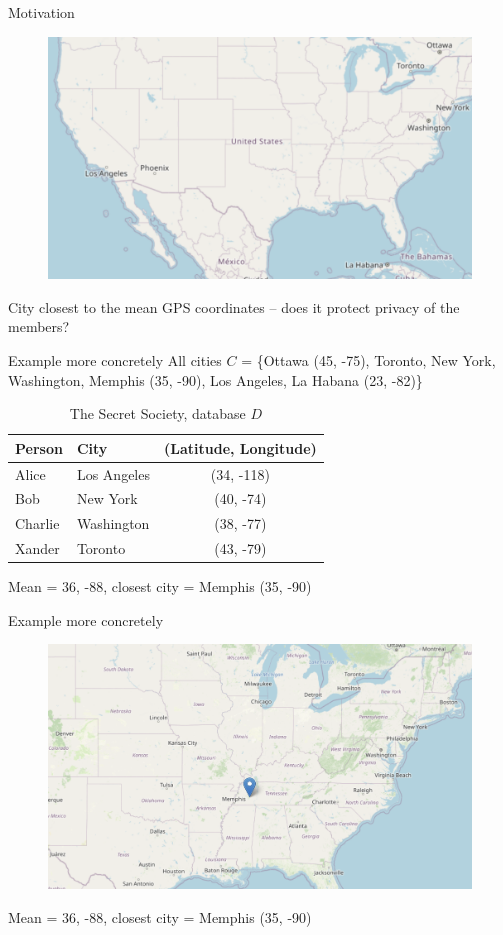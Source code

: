 \documentclass[12pt,aspectratio=169,handout]{beamer}
\begin{document}
\begin{frame}{Motivation}
\begin{figure}
\includegraphics[width=0.9\linewidth]{img/osm1.png}
\end{figure}
City closest to the mean GPS coordinates -- does it protect privacy of the members?
\end{frame}


\begin{frame}{Example more concretely}
All cities $C$ = \{Ottawa (45, -75), Toronto, New York, Washington, Memphis (35, -90), Los Angeles, La Habana (23, -82)\}

\begin{table}
\footnotesize
\begin{tabular}{llc}
\toprule
Person & City & (Latitude, Longitude)\\ \midrule
Alice & Los Angeles & (34, -118) \\
Bob & New York & (40, -74) \\
Charlie & Washington & (38, -77) \\
Xander & Toronto & (43, -79) \\ \bottomrule
\end{tabular}
\caption{The Secret Society, database $D$}
\end{table}

Mean = 36, -88, closest city = Memphis (35, -90)

\end{frame}


\begin{frame}{Example more concretely}

\begin{figure}
\includegraphics[width=0.9\linewidth]{img/osm2.png}
\end{figure}
Mean = 36, -88, closest city = Memphis (35, -90)

\end{frame}
\end{document}
